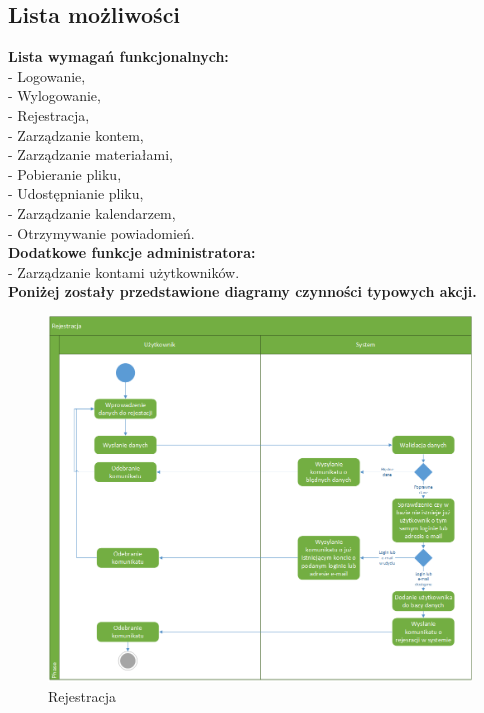\subsection{Lista możliwości}
\label{listaFun}
\textbf{Lista wymagań funkcjonalnych:}\\
- Logowanie,\\
- Wylogowanie,\\
- Rejestracja,\\
- Zarządzanie kontem,\\
- Zarządzanie materiałami,\\
- Pobieranie pliku,\\
- Udostępnianie pliku,\\
- Zarządzanie kalendarzem,\\
- Otrzymywanie powiadomień.\\
\textbf{Dodatkowe funkcje administratora:}\\
- Zarządzanie kontami użytkowników.\\
\textbf{Poniżej zostały przedstawione diagramy czynności typowych akcji.}
	\begin{figure}[H]
	\centering
	\includegraphics[scale=0.5]{Rejestracja}
	\caption{\label{fig:activity_01}Rejestracja}
	\end{figure}
